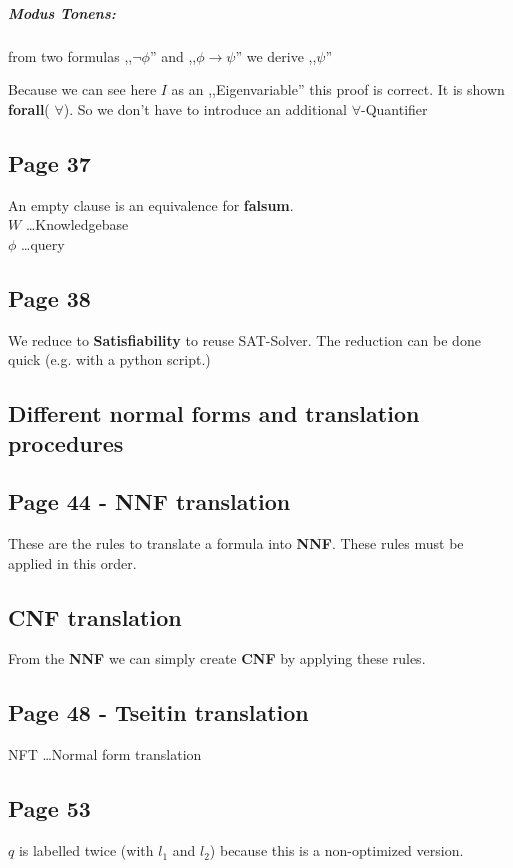 \documentclass[a4paper]{article}
\newcommand{\tb}[1]{\textbf{#1}}
\begin{document}
\subparagraph{Modus Tonens:} from two formulas ,,$\neg \phi$'' and ,,$\phi
\rightarrow \psi$'' we derive ,,$\psi$''

Because we can see here $I$ as an ,,Eigenvariable'' this proof is correct. It
is shown \tb{forall}( $\forall$). So we don't have to introduce an additional 
$\forall$-Quantifier


\subsection{Page 37}
An empty clause is an equivalence for  \tb{falsum}.\\
$W$ \ldots Knowledgebase\\ $\phi$ \ldots query

\subsection{Page 38}
We reduce to \tb{Satisfiability} to reuse SAT-Solver.
The reduction can be done quick (e.g. with a python script.)


\subsection{Different normal forms and translation procedures}

\subsection{Page 44 - NNF translation}
These are the rules to translate a formula into \tb{NNF}. These rules must be
applied in this order.

\subsection{CNF translation}
From the \tb{NNF} we can simply create \tb{CNF} by applying these rules.

\subsection{Page 48 - Tseitin translation}
NFT \ldots Normal form translation

\subsection{Page 53}

$q$ is labelled twice (with $l_1$ and $l_2$) because this
is a non-optimized version.
\end{document}
